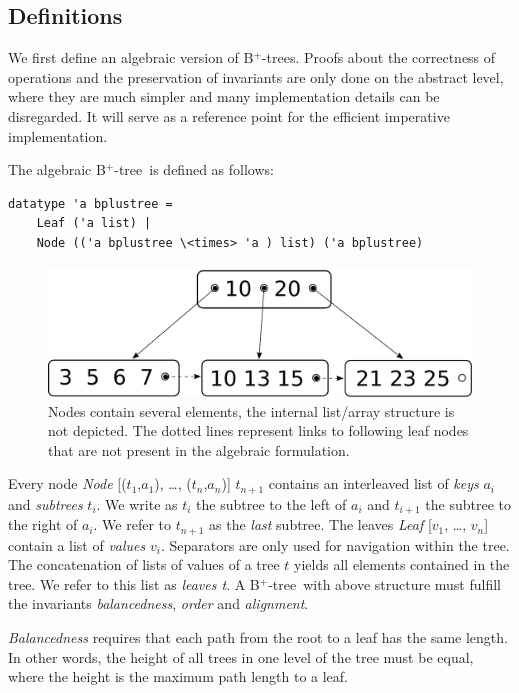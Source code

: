 \documentclass[a4paper,UKenglish,cleveref, cref, thm-restate]{lipics-v2021}
\newcommand{\btree}{B$^+$-tree}
\newcommand{\btrees}{B$^+$-trees}
\begin{document}
\subsection{Definitions}
\label{sec:data_structure_defs}


We first define an algebraic version of \btrees.
Proofs about the correctness of operations and the preservation of invariants
are only done on the abstract level, where they are much simpler
and many implementation details can be disregarded.
It will serve as a reference point for the efficient
imperative implementation.

The algebraic \btree\ is defined as follows:

\begin{lstlisting}[mathescape=true, language=Isabelle,label=lst:btree-def]
datatype 'a bplustree =
    Leaf ('a list) |
    Node (('a bplustree \<times> 'a ) list) ('a bplustree)
\end{lstlisting}


\begin{figure}
    \centering
    \includegraphics[width=0.5\linewidth]{btree-basic-nopair.pdf}
    \caption[Visualization of a \btree]
    {Nodes contain several elements, the internal list/array structure is not depicted.
    The dotted lines represent links to following leaf nodes that are not present in the algebraic formulation.}
    \label{fig:btree-basic}
\end{figure}


Every node \emph{Node} [($t_1$,$a_1$), …, ($t_n$,$a_n$)] $t_{n+1}$ contains an interleaved list of \textit{keys} $a_i$ and \textit{subtrees} $t_i$.
We write as $t_i$ the subtree to the left of $a_i$ and
$t_{i+1}$ the subtree to the right of $a_i$.
We refer to $t_{n+1}$ as the \textit{last} subtree.
The leaves \emph{Leaf} [$v_1$, …, $v_n$] contain a list of \textit{values} $v_i$.
Separators are only used for navigation within the tree.
The concatenation of lists of values of a tree $t$ yields
all elements contained in the tree. We refer to this list as \emph{leaves t}.
A \btree\ with above structure must fulfill the invariants
\textit{balancedness}, \textit{order} and \textit{alignment}.

\textit{Balancedness} requires
that each path from the root to a leaf has the same length.
In other words, the height of all trees in one level of the tree must be equal,
where the height is the maximum path length to a leaf.
\end{document}
